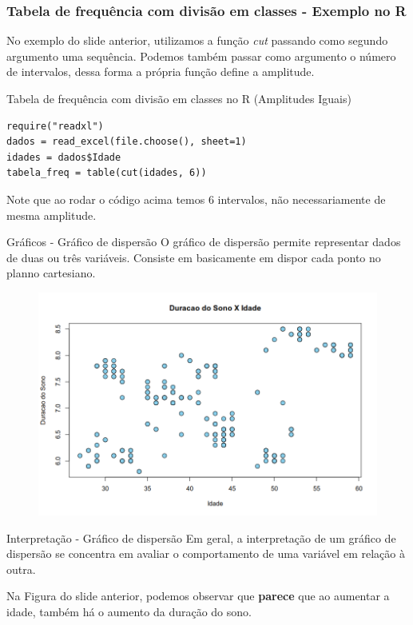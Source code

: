 \begin{frame}[fragile]
\frametitle{Tabela de frequência  com divisão em classes - Exemplo no R}
    No exemplo do slide anterior, utilizamos a função \textit{cut} passando como segundo argumento uma sequência. 
    Podemos também passar como argumento o número de intervalos, dessa forma a própria função define a amplitude. 
\begin{block}{Tabela de frequência com divisão em classes no R (Amplitudes Iguais)}
\begin{verbatim}
require("readxl")
dados = read_excel(file.choose(), sheet=1) 
idades = dados$Idade
tabela_freq = table(cut(idades, 6))
\end{verbatim}
\end{block}
Note que ao rodar o código acima temos 6 intervalos, não necessariamente de mesma amplitude. 
\end{frame}


\begin{frame}{Gráficos - Gráfico de dispersão}
    O gráfico de dispersão permite representar dados de duas ou três variáveis. Consiste em basicamente em dispor cada ponto no planno cartesiano. 
    \begin{figure}
    \centering
    \includegraphics[width=0.8\linewidth]{figures/grafico_dispersao.png}
    \end{figure}
\end{frame}

\begin{frame}{Interpretação - Gráfico de dispersão}
    Em geral, a interpretação de um gráfico de dispersão se concentra em avaliar o comportamento de uma variável em relação à outra. 

    Na Figura do slide anterior, podemos observar que \textbf{parece} que ao aumentar a idade, também há o aumento da duração do sono. 
\end{frame}

